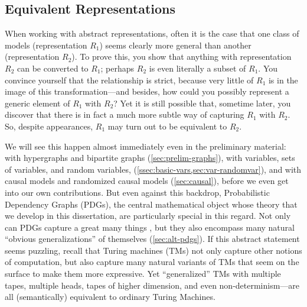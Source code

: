 \subsection{Equivalent Representations}


When working with abstract representations, often it is the case that one class of models (representation $R_1$) seems clearly more general than another (representation $R_2$).
To prove this, you show that anything with representation $R_2$ can be converted to $R_1$; perhaps $R_2$ is even literally a subset of $R_1$. 
You convince yourself that the relationship is strict, because very little of $R_1$ is in the image of this transformation---and besides, how could you possibly represent a generic element of $R_1$ with $R_2$? 
Yet it is still possible that, sometime later,
you discover that there is in fact a much more subtle way of capturing $R_1$ with $R_2$. 
So, despite appearances, $R_1$ may turn out to be equivalent to $R_2$. 

%
We will see this happen almost immediately even in the preliminary material: with hypergraphs and bipartite graphs (\cref{sec:prelim-graphs}), with variables, sets of variables, and random variables, (\cref{ssec:basic-vars,sec:var-randomvar}), and with causal models and randomized causal models (\cref{sec:causal}),
before we even get into our own contributions. 
%
But even against this backdrop,
Probabilistic Dependency Graphs (PDGs), the central mathematical object whose theory that we develop in this dissertation, are particularly special in this regard. 
Not only can PDGs capture a great many things 
\unskip, but they also encompass many natural ``obvious generalizations'' of themselves (\cref{sec:alt-pdgs}). 
If this abstract statement seems puzzling, recall that Turing machines (TMs) not only capture other notions of computation, but also capture many natural variants of TMs that seem on the surface to make them more expressive.  
Yet ``generalized'' TMs with multiple tapes, multiple heads, tapes of higher dimension, and even non-determinism---are all (semantically) equivalent to ordinary Turing Machines. 

